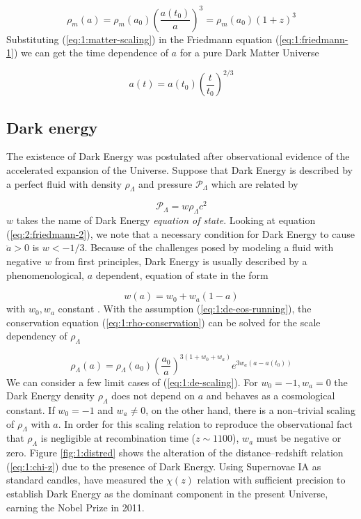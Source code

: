 \begin{equation}
\label{eq:1:matter-scaling}
\rho_m(a) = \rho_m(a_0)\left(\frac{a(t_0)}{a}\right)^3 = \rho_m(a_0)(1+z)^3 
\end{equation} 
%
Substituting (\ref{eq:1:matter-scaling}) in the Friedmann equation (\ref{eq:1:friedmann-1}) we can get the time dependence of $a$ for a pure Dark Matter Universe

\begin{equation}
\label{eq:1:matter-only-a}
a(t) = a(t_0)\left(\frac{t}{t_0}\right)^{2/3}
\end{equation}

\subsection{Dark energy}
The existence of Dark Energy was postulated after observational evidence of the accelerated expansion of the Universe. Suppose that Dark Energy is described by a perfect fluid with density $\rho_\Lambda$ and pressure $\mathcal{P}_\Lambda$ which are related by

\begin{equation}
\label{eq:1:de-eos}
\mathcal{P}_\Lambda = w\rho_\Lambda c^2
\end{equation}
%
$w$ takes the name of Dark Energy \textit{equation of state}. Looking at equation (\ref{eq:2:friedmann-2}), we note that a necessary condition for Dark Energy to cause $\ddot{a}>0$ is $w<-1/3$. Because of the challenges posed by modeling a fluid with negative $w$ from first principles, Dark Energy is usually described by a phenomenological, $a$ dependent, equation of state in the form

\begin{equation}
\label{eq:1:de-eos-running}
w(a) = w_0 + w_a(1-a)
\end{equation}
%
with $w_0,w_a$ constant \citep{LinderDE}. With the assumption (\ref{eq:1:de-eos-running}), the conservation equation (\ref{eq:1:rho-conservation}) can be solved for the scale dependency of $\rho_\Lambda$

\begin{equation}
\label{eq:1:de-scaling}
\rho_\Lambda(a) = \rho_\Lambda(a_0)\left(\frac{a_0}{a}\right)^{3(1+w_0+w_a)}e^{3w_a(a-a(t_0))} 
\end{equation}
%
We can consider a few limit cases of (\ref{eq:1:de-scaling}). For $w_0=-1,w_a=0$ the Dark Energy density $\rho_\Lambda$ does not depend on $a$ and behaves as a cosmological constant. If $w_0=-1$ and $w_a\neq 0$, on the other hand, there is a non--trivial scaling of $\rho_\Lambda$ with $a$. In order for this scaling relation to reproduce the observational fact that $\rho_\Lambda$ is negligible at recombination time ($z\sim 1100$), $w_a$ must be negative or zero. Figure \ref{fig:1:distred} shows the alteration of the distance--redshift relation (\ref{eq:1:chi-z}) due to the presence of Dark Energy. Using Supernovae IA as standard candles, \citep{PerlmutterNobel} have measured the $\chi(z)$ relation with sufficient precision to establish Dark Energy as the dominant component in the present Universe, earning the Nobel Prize in 2011.  

